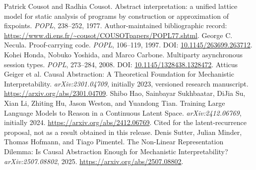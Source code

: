  Patrick Cousot and Radhia Cousot. Abstract interpretation: a unified lattice model for static analysis of programs by construction or approximation of fixpoints. \emph{POPL}, 238--252, 1977. Author-maintained bibliographic record: \url{https://www.di.ens.fr/~cousot/COUSOTpapers/POPL77.shtml}.
 George C. Necula. Proof-carrying code. \emph{POPL}, 106--119, 1997. DOI: \href{https://doi.org/10.1145/263699.263712}{10.1145/263699.263712}.
 Kohei Honda, Nobuko Yoshida, and Marco Carbone. Multiparty asynchronous session types. \emph{POPL}, 273--284, 2008. DOI: \href{https://doi.org/10.1145/1328438.1328472}{10.1145/1328438.1328472}.
 Atticus Geiger et al. Causal Abstraction: A Theoretical Foundation for Mechanistic Interpretability. \emph{arXiv:2301.04709}, initially 2023, versioned research manuscript. \url{https://arxiv.org/abs/2301.04709}.
 Shibo Hao, Sainbayar Sukhbaatar, DiJia Su, Xian Li, Zhiting Hu, Jason Weston, and Yuandong Tian. Training Large Language Models to Reason in a Continuous Latent Space. \emph{arXiv:2412.06769}, initially 2024. \url{https://arxiv.org/abs/2412.06769}. Cited for the latent-recurrence proposal, not as a result obtained in this release.
 Denis Sutter, Julian Minder, Thomas Hofmann, and Tiago Pimentel. The Non-Linear Representation Dilemma: Is Causal Abstraction Enough for Mechanistic Interpretability? \emph{arXiv:2507.08802}, 2025. \url{https://arxiv.org/abs/2507.08802}.
